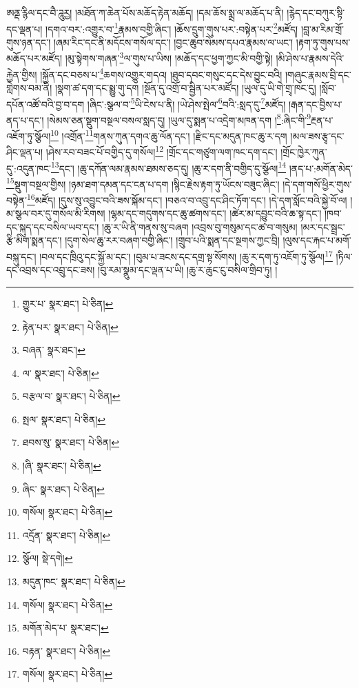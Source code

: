 ཨནྡ་རྙིལ་དང་བཻ་ཌཱུརྱ། །མཐོན་ཀ་ཆེན་པོས་མཆོད་རྟེན་མཆོད། །དམ་ཆོས་སྨྲ་ལ་མཆོད་པ་ནི། །རྙེད་དང་བཀུར་སྟི་དང་ལྡན་པ། །དགའ་བར་:འགྱུར་བ་\footnote{གྱུར་པ་  སྣར་ཐང་།  པེ་ཅིན། }རྣམས་བགྱི་ཞིང་། །ཆོས་དྲུག་གུས་པར་:བསྟེན་པར་\footnote{རྟེན་པར་  སྣར་ཐང་།  པེ་ཅིན། }མཛོད། །བླ་མ་རིམ་གྲོ་གུས་ཉན་དང་། །ཞམ་རིང་དང་ནི་མདོངས་གསོལ་དང་། །བྱང་ཆུབ་སེམས་དཔའ་རྣམས་ལ་ཡང་། །རྟག་ཏུ་གུས་པས་མཆོད་པར་མཛོད། །མུ་སྟེགས་གཞན་\footnote{བཞན་  སྣར་ཐང་། }ལ་གུས་པ་ཡིས། །མཆོད་དང་ཕྱག་ཀྱང་མི་བགྱི་སྟེ། །མི་ཤེས་པ་རྣམས་དེའི་རྐྱེན་གྱིས། །སྐྱོན་དང་བཅས་པ་\footnote{ལ་  སྣར་ཐང་།  པེ་ཅིན། }ཆགས་འགྱུར་གདའ། །ཐུབ་དབང་གསུང་དང་དེས་བྱུང་བའི། །གཞུང་རྣམས་བྲི་དང་གླེགས་བམ་ནི། །སྣག་ཚ་དག་དང་སྨྱུ་གུ་དག །སྔོན་དུ་འགྲོ་བ་སྦྱིན་པར་མཛོད། །ཡུལ་དུ་ཡི་གེ་གྲྭ་ཁང་དུ། །སློབ་དཔོན་འཚོ་བའི་བྱ་བ་དག །ཞིང་:སྩལ་བ་\footnote{བརྩལ་བ་  སྣར་ཐང་།  པེ་ཅིན། }ཡི་ངེས་པ་ནི། །ཡེ་ཤེས་སྤེལ་\footnote{སྤལ་  སྣར་ཐང་།  པེ་ཅིན། }བའི་:སླད་དུ་\footnote{ཐབས་སུ་  སྣར་ཐང་།  པེ་ཅིན། }མཛོད། །རྒན་དང་བྱིས་པ་ནད་པ་དང་། །སེམས་ཅན་སྡུག་བསྔལ་བསལ་སླད་དུ། །ཡུལ་དུ་སྨན་པ་འདྲེག་མཁན་དག །\footnote{།ཞི་  སྣར་ཐང་།  པེ་ཅིན། }:ཞིང་གི་\footnote{ཞིང་  སྣར་ཐང་།  པེ་ཅིན། }རྔན་པ་འཇོག་ཏུ་སྩོལ།\footnote{གསོལ།  སྣར་ཐང་།  པེ་ཅིན། } །འགྲོན་\footnote{འདྲོན་  སྣར་ཐང་།  པེ་ཅིན། }གནས་ཀུན་དགའ་ཆུ་ལོན་དང་། །རྫིང་དང་མདུན་ཁང་ཆུ་ར་དག །མལ་ཟས་རྩྭ་དང་ཤིང་ལྡན་པ། །ཤེས་རབ་བཟང་པོ་བགྱིད་དུ་གསོལ།\footnote{སྩོལ།  སྡེ་དགེ། } །གྲོང་དང་གཙུག་ལག་ཁང་དག་དང་། །གྲོང་ཁྱེར་ཀུན་དུ་:འདུན་ཁང་\footnote{མདུན་ཁང་  སྣར་ཐང་།  པེ་ཅིན། }དང་། །ཆུ་དཀོན་ལམ་རྣམས་ཐམས་ཅད་དུ། །ཆུ་ར་དག་ནི་བགྱིད་དུ་སྩོལ།\footnote{གསོལ།  སྣར་ཐང་།  པེ་ཅིན། } །ནད་པ་:མགོན་མེད་\footnote{མགོན་མེད་པ་  སྣར་ཐང་། }སྡུག་བསྔལ་གྱིས། །ཉམ་ཐག་དམན་དང་ངན་པ་དག །སྙིང་རྗེས་རྟག་ཏུ་ཡོངས་བཟུང་ཞིང་། །དེ་དག་གསོ་ཕྱིར་གུས་བསྟེན་\footnote{བརྟན་  སྣར་ཐང་།  པེ་ཅིན། }མཛོད། །དུས་སུ་འབྱུང་བའི་ཟས་སྐོམ་དང་། །བཅའ་བ་འབྲུ་དང་ཤིང་ཏོག་དང་། །དེ་དག་སློང་བའི་སྐྱེ་བོ་ལ། །མ་སྩལ་བར་དུ་གསོལ་མི་རིགས། །ལྷམ་དང་གདུགས་དང་ཆུ་ཚགས་དང་། །ཚེར་མ་དབྱུང་བའི་ཆ་སྟ་དང་། །ཁབ་དང་སྐུད་དང་བསིལ་ཡབ་དང་། །ཆུ་ར་ཡི་ནི་གནས་སུ་བཞག །འབྲས་བུ་གསུམ་དང་ཚ་བ་གསུམ། །མར་དང་སྦྲང་རྩི་མིག་སྨན་དང་། །དུག་སེལ་ཆུ་རར་བཞག་བགྱི་ཞིང་། །གྲུབ་པའི་སྨན་དང་སྔགས་ཀྱང་བྲི། །ལུས་དང་རྐང་པ་མགོ་བསྐུ་དང་། །བལ་དང་ཁྲིའུ་དང་སྐྱོ་མ་དང་། །བུམ་པ་ཟངས་དང་དགྲ་སྟ་སོགས། །ཆུ་ར་དག་ཏུ་འཇོག་ཏུ་སྩོལ།\footnote{གསོལ།  སྣར་ཐང་།  པེ་ཅིན། } །ཏིལ་དང་འབྲས་དང་འབྲུ་དང་ཟས། །བུ་རམ་སྣུམ་དང་ལྡན་པ་ཡི། །ཆུ་ར་ཆུང་ངུ་བསིལ་གྲིབ་ཏུ། །
